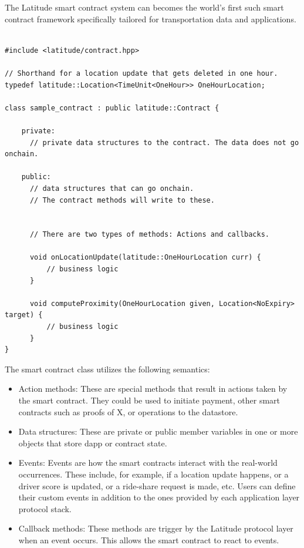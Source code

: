 The Latitude smart contract system can becomes the world's first such smart contract framework specifically tailored for
transportation data and applications.

\lstset{language=C++,basicstyle=\small}

\begin{lstlisting}[float, caption=Structure of a Latitude Smart Contract, frame=lines]

#include <latitude/contract.hpp>

// Shorthand for a location update that gets deleted in one hour.
typedef latitude::Location<TimeUnit<OneHour>> OneHourLocation;

class sample_contract : public latitude::Contract {

    private:
      // private data structures to the contract. The data does not go onchain.

    public:
      // data structures that can go onchain.
      // The contract methods will write to these.


      // There are two types of methods: Actions and callbacks.

      void onLocationUpdate(latitude::OneHourLocation curr) {
          // business logic
      }

      void computeProximity(OneHourLocation given, Location<NoExpiry> target) {
          // business logic
      }
}
\end{lstlisting}

The smart contract class utilizes the following semantics:
\begin{itemize}
    \item Action methods: These are special methods that result in actions taken by the smart contract. They could be
        used to initiate payment, other smart contracts such as proofs of X, or operations to the datastore.
    \item Data structures: These are private or public member variables in one or more objects that store dapp or
        contract state.
    \item Events: Events are how the smart contracts interact with the real-world occurrences. These include, for
        example, if a location update happens, or a driver score is updated, or a ride-share request is made, etc. Users
        can define their custom events in addition to the ones provided by each application layer protocol stack.
    \item Callback methods: These methods are trigger by the Latitude protocol layer when an event occurs. This allows
        the smart contract to react to events.
\end{itemize}

